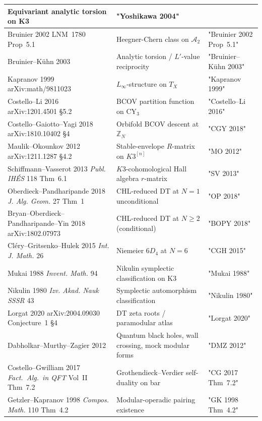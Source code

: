 \documentclass[11pt]{article}
\theoremstyle{definition}
\begin{document}
\begin{longtable}{p{5cm}|p{5cm}|p{4.5cm}}
Equivariant analytic torsion on K3 &
"Yoshikawa 2004" \\
\hline
Bruinier 2002 LNM~1780 Prop~5.1 &
Heegner-Chern class on $\mathcal A_2$ &
"Bruinier 2002 Prop~5.1" \\
\hline
Bruinier--K\"uhn 2003 &
Analytic torsion / $L'$-value reciprocity &
"Bruinier--K\"uhn 2003" \\
\hline
Kapranov 1999 arXiv:math/9811023 &
$L_\infty$-structure on $T_X$ &
"Kapranov 1999" \\
\hline
Costello--Li 2016 arXiv:1201.4501 \S 5.2 &
BCOV partition function on CY$_3$ &
"Costello--Li 2016" \\
\hline
Costello--Gaiotto--Yagi 2018 arXiv:1810.10402 \S 4 &
Orbifold BCOV descent at $\mathbb Z_N$ &
"CGY 2018" \\
\hline
Maulik--Okounkov 2012 arXiv:1211.1287 \S 4.2 &
Stable-envelope $R$-matrix on $K3^{[n]}$ &
"MO 2012" \\
\hline
Schiffmann--Vasserot 2013 \emph{Publ. IH\'ES} 118 Thm~6.1 &
$K3$-cohomological Hall algebra $r$-matrix &
"SV 2013" \\
\hline
Oberdieck--Pandharipande 2018 \emph{J. Alg. Geom.} 27 Thm~1 &
CHL-reduced DT at $N = 1$ unconditional &
"OP 2018" \\
\hline
Bryan--Oberdieck--Pandharipande--Yin 2018 arXiv:1802.07973 &
CHL-reduced DT at $N \geq 2$ (conditional) &
"BOPY 2018" \\
\hline
Cl\'ery--Gritsenko--Hulek 2015 \emph{Int. J. Math.} 26 &
Niemeier $6 D_4$ at $N = 6$ &
"CGH 2015" \\
\hline
Mukai 1988 \emph{Invent. Math.} 94 &
Nikulin symplectic classification on K3 &
"Mukai 1988" \\
\hline
Nikulin 1980 \emph{Izv. Akad. Nauk SSSR} 43 &
Symplectic automorphism classification &
"Nikulin 1980" \\
\hline
Lorgat 2020 arXiv:2004.09030 Conjecture~1 \S 4 &
DT zeta roots / paramodular atlas &
"Lorgat 2020" \\
\hline
Dabholkar--Murthy--Zagier 2012 &
Quantum black holes, wall crossing, mock modular forms &
"DMZ 2012" \\
\hline
Costello--Gwilliam 2017 \emph{Fact.\ Alg.\ in QFT} Vol~II Thm~7.2 &
Grothendieck--Verdier self-duality on bar &
"CG 2017 Thm~7.2" \\
\hline
Getzler--Kapranov 1998 \emph{Compos. Math.} 110 Thm~4.2 &
Modular-operadic pairing existence &
"GK 1998 Thm~4.2" \\
\hline
\end{longtable}
\end{document}
